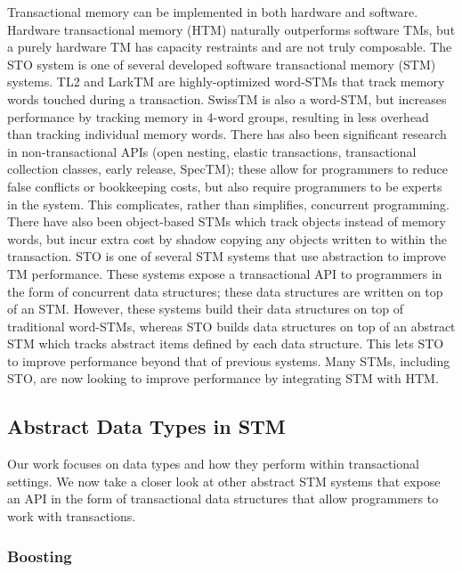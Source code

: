 Transactional memory can be implemented in both hardware and software. Hardware transactional memory (HTM) naturally outperforms software TMs, but a purely hardware TM has capacity restraints and are not truly composable\cite{htm}. The STO system\cite{sto} is one of several developed software transactional memory (STM) systems. TL2\cite{tl2} and LarkTM\cite{larktm} are highly-optimized word-STMs that track memory words touched during a transaction. SwissTM\cite{swisstm} is also a word-STM, but increases performance by tracking memory in 4-word groups, resulting in less overhead than tracking individual memory words. There has also been significant research in non-transactional APIs (open nesting\cite{opennesting}, elastic transactions\cite{elastic}, transactional collection classes\cite{tcc}, early release\cite{earlyrelease}, SpecTM\cite{spectm}); these allow for programmers to reduce false conflicts or bookkeeping costs, but also require programmers to be experts in the system. This complicates, rather than simplifies, concurrent programming. There have also been object-based STMs which track objects instead of memory words, but incur extra cost by shadow copying any objects written to within the transaction. STO is one of several STM systems that use abstraction to improve TM performance\cite{boost}\cite{optboost}\cite{autolock}\cite{predication}. These systems expose a transactional API to programmers in the form of concurrent data structures; these data structures are written on top of an STM. However, these systems build their data structures on top of traditional word-STMs, whereas STO builds data structures on top of an abstract STM which tracks abstract items defined by each data structure. This lets STO to improve performance beyond that of previous systems. Many STMs, including STO, are now looking to improve performance by integrating STM with HTM.

\subsection{Abstract Data Types in STM}
Our work focuses on data types and how they perform within transactional settings. We now take a closer look at other abstract STM systems that expose an API in the form of transactional data structures that allow programmers to work with transactions.

\subsubsection{Boosting}
